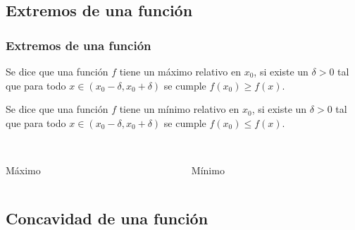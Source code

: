 \subsection{Extremos de una función}
\begin{frame}
\frametitle{Extremos de una función}
\begin{definicion}
Se dice que una función $f$ tiene un máximo relativo en $x_0$, si existe un $\delta>0$ tal que para todo $x\in (x_0-\delta,x_0+\delta)$ se cumple $f(x_0)\geq f(x)$.

Se dice que una función $f$ tiene un mínimo relativo en $x_0$, si existe un $\delta>0$ tal que para todo $x\in (x_0-\delta,x_0+\delta)$ se cumple $f(x_0)\leq f(x)$.
\end{definicion}

\begin{columns}
\begin{column}{0.4\textwidth}
\begin{center}
\scalebox{1}{}\\
\color{red}Máximo
\end{center}
\end{column}
\begin{column}{0.4\textwidth}
\begin{center}
\scalebox{1}{}\\
\color{red}Mínimo
\end{center}
\end{column}
\end{columns}
\end{frame} 


\subsection{Concavidad de una función}

